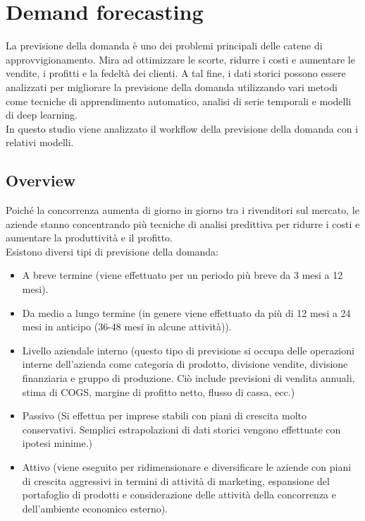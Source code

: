 \documentclass[12pt,a4paper]{report}
\begin{document}
\chapter{Demand forecasting}
La previsione della domanda è uno dei problemi principali delle catene di approvvigionamento. Mira ad ottimizzare le scorte, ridurre i costi e aumentare le vendite, i profitti e la fedeltà dei clienti. A tal fine, i dati storici possono essere analizzati per migliorare la previsione della domanda utilizzando vari metodi come tecniche di apprendimento automatico, analisi di serie temporali e modelli di deep learning.\\
In questo studio viene analizzato il workflow della previsione della domanda con i relativi modelli. 

\section{Overview}
Poiché la concorrenza aumenta di giorno in giorno tra i rivenditori sul mercato, le aziende stanno concentrando più tecniche di analisi predittiva per ridurre i costi e aumentare la produttività e il profitto.\\
Esistono diversi tipi di previsione della domanda:
\begin{itemize}
    \item A breve termine (viene effettuato per un periodo più breve da 3 mesi a 12 mesi). 
    \item Da medio a lungo termine (in genere viene effettuato da più di 12 mesi a 24 mesi in anticipo (36-48 mesi in alcune attività)).
    \item Livello aziendale interno (questo tipo di previsione si occupa delle operazioni interne dell'azienda come categoria di prodotto, divisione vendite, divisione finanziaria e gruppo di produzione. Ciò include previsioni di vendita annuali, stima di COGS, margine di profitto netto, flusso di cassa, ecc.)
    \item Passivo (Si effettua per imprese stabili con piani di crescita molto conservativi. Semplici estrapolazioni di dati storici vengono effettuate con ipotesi minime.)
    \item Attivo (viene eseguito per ridimensionare e diversificare le aziende con piani di crescita aggressivi in termini di attività di marketing, espansione del portafoglio di prodotti e considerazione delle attività della concorrenza e dell'ambiente economico esterno).
\end{itemize}
\end{document}
